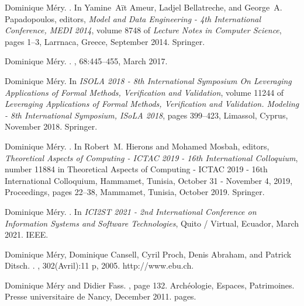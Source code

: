 \documentclass[ 12pt]{article}
\begin{document}
\begin{thebibliography}{100}
Dominique M{\'e}ry.
.
\newblock In Yamine~A{\"i}t Ameur, Ladjel Bellatreche, and George~A.
  Papadopoulos, editors, {\em {Model and Data Engineering - 4th International
  Conference, MEDI 2014}}, volume 8748 of {\em Lecture Notes in Computer
  Science}, pages 1--3, Larrnaca, Greece, September 2014. {Springer}.

Dominique M{\'e}ry.
.
, 68:445--455, March 2017.

Dominique M{\'e}ry.
\newblock In {\em {ISOLA 2018 - 8th International Symposium On Leveraging
  Applications of Formal Methods, Verification and Validation}}, volume 11244
  of {\em Leveraging Applications of Formal Methods, Verification and
  Validation. Modeling - 8th International Symposium, ISoLA 2018}, pages
  399--423, Limassol, Cyprus, November 2018. {Springer}.

Dominique M{\'e}ry.
.
\newblock In Robert~M. Hierons and Mohamed Mosbah, editors, {\em {Theoretical
  Aspects of Computing - {ICTAC} 2019 - 16th International Colloquium}}, number
  11884 in Theoretical Aspects of Computing - {ICTAC} 2019 - 16th International
  Colloquium, Hammamet, Tunisia, October 31 - November 4, 2019, Proceedings,
  pages 22--38, Mammamet, Tunisia, October 2019. {Springer}.

Dominique M{\'e}ry.
.
\newblock In {\em {ICI2ST 2021 - 2nd International Conference on Information
  Systems and Software Technologies}}, Quito / Virtual, Ecuador, March 2021.
  {IEEE}.

Dominique M{\'e}ry, Dominique Cansell, Cyril Proch, Denis Abraham, and Patrick
  Ditsch.
.
, 302(Avril):11 p, 2005.
\newblock http://www.ebu.ch.

Dominique M{\'e}ry and Didier Fass.
, page 132.
\newblock Arch{\'e}ologie, Espaces, Patrimoines. {Presse universitaire de
  Nancy}, December 2011.
 pages.


\end{thebibliography}
\end{document}
